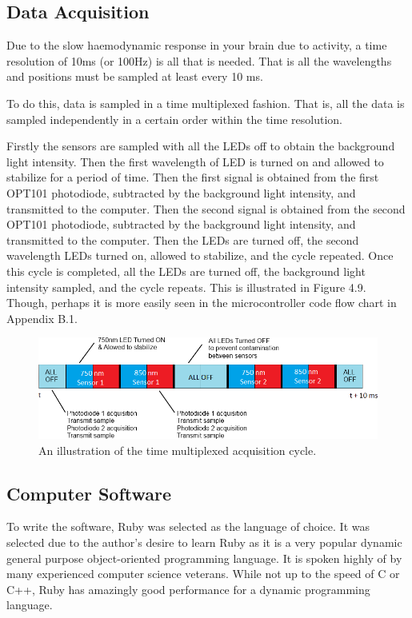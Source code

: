 \subsection{Data Acquisition}
Due to the slow haemodynamic response in your brain due to activity, a time resolution of 10ms (or 100Hz) is all that is needed. That is all the wavelengths and positions must be sampled at least every 10 ms.

To do this, data is sampled in a time multiplexed fashion. That is, all the data is sampled independently in a certain order within the time resolution. 

Firstly the sensors are sampled with all the LEDs off to obtain the background light intensity. Then the first wavelength of LED is turned on and allowed to stabilize for a period of time. Then the first signal is obtained from the first OPT101 photodiode, subtracted by the background light intensity, and transmitted to the computer.  Then the second signal is obtained from the second OPT101 photodiode, subtracted by the background light intensity, and transmitted to the computer. Then the LEDs are turned off, the second wavelength LEDs turned on, allowed to stabilize, and the cycle repeated. Once this cycle is completed, all the LEDs are turned off, the background light intensity sampled, and the cycle repeats. This is illustrated in Figure 4.9. Though, perhaps it is more easily seen in the microcontroller code flow chart in Appendix B.1.

\begin{figure}[htp]
\centering
\includegraphics[width=6in]{data.png}
\caption[Time multiplexed acquisition]{An illustration of the time multiplexed acquisition cycle.}
\end{figure}

\subsection {Computer Software}

To write the software, Ruby was selected as the language of choice. It was selected due to the author's desire to learn Ruby as it is a very popular dynamic general purpose object-oriented programming language. It is spoken highly of by many experienced computer science veterans. While not up to the speed of C or C++, Ruby has amazingly good performance for a dynamic programming language.

